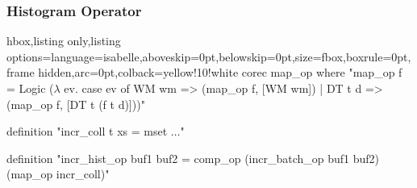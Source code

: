 \documentclass[aspectratio=169,10pt]{beamer}
\begin{document}
\begin{frame}[fragile]
  \frametitle{Histogram Operator}
\vspace*{-1ex}
\begin{tcblisting}{hbox,listing only,listing options={language=isabelle,aboveskip=0pt,belowskip=0pt},size=fbox,boxrule=0pt,frame hidden,arc=0pt,colback=yellow!10!white}
corec map_op where "map_op f = Logic ($\lambda$ ev. case ev of
       WM wm => (map_op f, [WM wm]) | DT t d => (map_op f, [DT t (f t d)]))"

definition "incr_coll t xs = mset $\ldots$"

definition "incr_hist_op buf1 buf2 =
  comp_op (incr_batch_op buf1 buf2) (map_op incr_coll)"
\end{tcblisting}
\vspace*{-1ex}

\end{frame}
\end{document}
